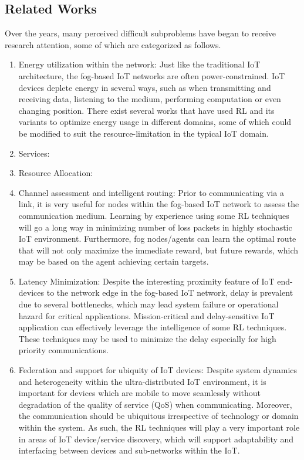 \documentclass[journal]{IEEEtran}
\begin{document}
\subsection{Related Works}
Over the years, many perceived difficult subproblems have began to receive research attention, some of which are categorized as follows.
\indent
    \begin{enumerate}[leftmargin=*,label= \arabic*)]
      \item Energy utilization within the network: Just like the traditional IoT architecture, the fog-based IoT networks are often power-constrained. IoT devices deplete energy in several ways, such as when transmitting and receiving data, listening to the medium, performing computation or even changing position. There exist several works that have used RL and its variants to optimize energy usage in different domains, some of which could be modified to suit the resource-limitation in the typical IoT domain.
          
      \item Services:
      
      \item Resource Allocation:

      \item Channel assessment and intelligent routing: Prior to communicating via a link, it is very useful for nodes within the fog-based IoT network to assess the communication medium. Learning by experience using some RL techniques will go a long way in minimizing number of loss packets in highly stochastic IoT environment. Furthermore, fog nodes/agents can learn the optimal route that will not only maximize the immediate reward, but future rewards, which may be based on the agent achieving certain targets.

      \item Latency Minimization: Despite the interesting proximity feature of IoT end-devices to the network edge in the fog-based IoT network, delay is prevalent due to several bottlenecks, which may lead system failure or operational hazard for critical applications. Mission-critical and delay-sensitive IoT application can effectively leverage the intelligence of some RL techniques. These techniques may be used to minimize the delay especially for high priority communications.

      \item Federation and support for ubiquity of IoT devices: Despite system dynamics and heterogeneity within the ultra-distributed IoT environment, it is important for devices which are mobile to move seamlessly without degradation of the quality of service (QoS) when communicating. Moreover, the communication should be ubiquitous irrespective of technology or domain within the system. As such, the RL techniques will play a very important role in areas of IoT device/service discovery, which will support adaptability and interfacing between devices and sub-networks within the IoT.


    \end{enumerate}
\end{document}
